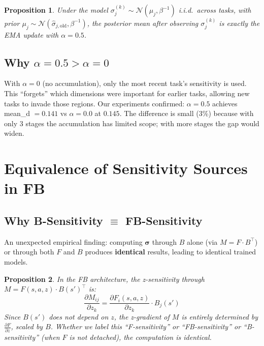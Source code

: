 \documentclass[11pt]{article}
\newtheorem{proposition}{Proposition}
\begin{document}
\begin{proposition}
Under the model $\sigma_j^{(k)} \sim \mathcal{N}(\mu_j, \beta^{-1})$ i.i.d.\ across tasks, with prior $\mu_j \sim \mathcal{N}(\hat{\sigma}_{j,\text{old}}, \beta^{-1})$, the posterior mean after observing $\sigma_j^{(k)}$ is exactly the EMA update with $\alpha = 0.5$.
\end{proposition}

\subsection{Why $\alpha = 0.5 > \alpha = 0$}

With $\alpha = 0$ (no accumulation), only the most recent task's sensitivity is used. This ``forgets'' which dimensions were important for earlier tasks, allowing new tasks to invade those regions. Our experiments confirmed: $\alpha = 0.5$ achieves mean\_d $= 0.141$ vs $\alpha = 0.0$ at $0.145$. The difference is small (3\%) because with only 3 stages the accumulation has limited scope; with more stages the gap would widen.

\section{Equivalence of Sensitivity Sources in FB}

\subsection{Why B-Sensitivity $\equiv$ FB-Sensitivity}

An unexpected empirical finding: computing $\bm{\sigma}$ through $B$ alone (via $M = F \cdot B^\top$) or through both $F$ and $B$ produces \textbf{identical} results, leading to identical trained models.

\begin{proposition}
In the FB architecture, the z-sensitivity through $M = F(s,a,z) \cdot B(s')^\top$ is:
\begin{equation}
    \frac{\partial M_{ij}}{\partial z_k} = \frac{\partial F_i(s,a,z)}{\partial z_k} \cdot B_j(s')
\end{equation}
Since $B(s')$ does not depend on $z$, the z-gradient of $M$ is entirely determined by $\frac{\partial F}{\partial z}$, scaled by $B$. Whether we label this ``F-sensitivity'' or ``FB-sensitivity'' or ``B-sensitivity'' (when $F$ is not detached), the computation is identical.
\end{proposition}
\end{document}
